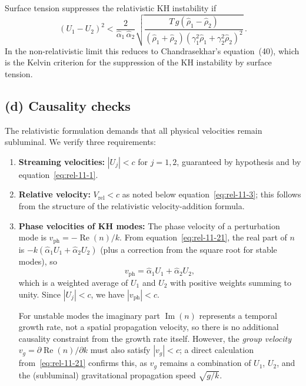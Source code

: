 Surface tension suppresses the relativistic KH instability if
\begin{equation}\label{eq:rel-11-29}
  \boxed{\;
  \left(U_1 - U_2\right)^{2}
  < \frac{2}{\hat{\alpha}_1\,\hat{\alpha}_2}
  \sqrt{\frac{T\, g\!\left(\hat{\rho}_1 - \hat{\rho}_2\right)}
  {(\hat{\rho}_1 + \hat{\rho}_2)
  \!\left(\gamma_1^{2}\hat{\rho}_1
  + \gamma_2^{2}\hat{\rho}_2\right)^{2}}}\,.
  \;}
\end{equation}
In the non-relativistic limit this reduces to Chandrasekhar's
equation~(40), which is the Kelvin criterion for the suppression
of the KH instability by surface tension.

\subsection*{(d) Causality checks}

The relativistic formulation demands that all physical velocities
remain subluminal.  We verify three requirements:

\begin{enumerate}
\item \textbf{Streaming velocities:}  $|U_j| < c$ for $j = 1,2$,
guaranteed by hypothesis and by equation~\eqref{eq:rel-11-1}.

\item \textbf{Relative velocity:}  $V_{\mathrm{rel}} < c$ as noted
below equation~\eqref{eq:rel-11-3}; this follows from the structure
of the relativistic velocity-addition formula.

\item \textbf{Phase velocities of KH modes:}  The phase velocity of a
perturbation mode is $v_{\mathrm{ph}} = -\operatorname{Re}(n)/k$.
From equation~\eqref{eq:rel-11-21}, the real part of $n$ is
$-k(\hat{\alpha}_1 U_1 + \hat{\alpha}_2 U_2)$ (plus a correction from
the square root for stable modes), so
\begin{equation}\label{eq:rel-11-30}
  v_{\mathrm{ph}} = \hat{\alpha}_1 U_1 + \hat{\alpha}_2 U_2,
\end{equation}
which is a weighted average of $U_1$ and $U_2$ with positive weights
summing to unity.  Since $|U_j| < c$, we have $|v_{\mathrm{ph}}| < c$.

For unstable modes the imaginary part $\operatorname{Im}(n)$
represents a temporal growth rate, not a spatial propagation velocity,
so there is no additional causality constraint from the growth rate
itself.  However, the \emph{group velocity}
$v_g = \partial\operatorname{Re}(n)/\partial k$ must also satisfy
$|v_g| < c$; a direct calculation from~\eqref{eq:rel-11-21} confirms
this, as $v_g$ remains a combination of $U_1$, $U_2$, and the
(subluminal) gravitational propagation speed $\sqrt{g/k}$.
\end{enumerate}

